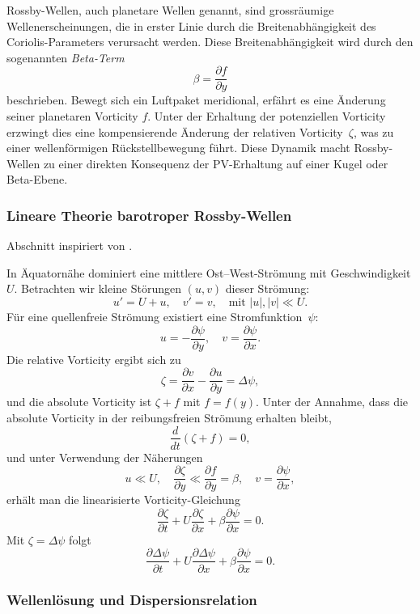 
Rossby-Wellen, auch planetare Wellen genannt, sind grossräumige Wellenerscheinungen, die in erster Linie durch die Breitenabhängigkeit des Coriolis-Parameters verursacht werden. Diese Breitenabhängigkeit wird durch den sogenannten \emph{Beta-Term}
\[
	\beta = \frac{\partial f}{\partial y}
\]
beschrieben. Bewegt sich ein Luftpaket meridional, erfährt es eine Änderung seiner planetaren Vorticity \(f\). Unter der Erhaltung der potenziellen Vorticity erzwingt dies eine kompensierende Änderung der relativen Vorticity~\(\zeta\), was zu einer wellenförmigen Rückstellbewegung führt. Diese Dynamik macht Rossby-Wellen zu einer direkten Konsequenz der PV-Erhaltung auf einer Kugel oder Beta-Ebene.

\subsubsection{Lineare Theorie barotroper Rossby-Wellen}

Abschnitt inspiriert von \cite{rossby:mueller2018}.

In Äquatornähe dominiert eine mittlere Ost–West-Strömung mit Geschwindigkeit \(U\). Betrachten wir kleine Störungen \((u,v)\) dieser Strömung:
\[
	u' = U + u, \quad v' = v, \quad \text{mit } |u|, |v| \ll U.
\]
Für eine quellenfreie Strömung existiert eine Stromfunktion~\(\psi\):
\[
	u = -\frac{\partial \psi}{\partial y}, \quad v = \frac{\partial \psi}{\partial x}.
\]
Die relative Vorticity ergibt sich zu
\[
	\zeta = \frac{\partial v}{\partial x} - \frac{\partial u}{\partial y} = \Delta \psi,
\]
und die absolute Vorticity ist \(\zeta + f\) mit \(f = f(y)\). Unter der Annahme, dass die absolute Vorticity in der reibungsfreien Strömung erhalten bleibt,
\[
	\frac{d}{dt} (\zeta + f) = 0,
\]
und unter Verwendung der Näherungen
\[
	u \ll U, \quad \frac{\partial \zeta}{\partial y} \ll \frac{\partial f}{\partial y} = \beta, \quad v = \frac{\partial \psi}{\partial x},
\]
erhält man die linearisierte Vorticity-Gleichung
\[
	\frac{\partial \zeta}{\partial t} + U \frac{\partial \zeta}{\partial x} + \beta \frac{\partial \psi}{\partial x} = 0.
\]
Mit \(\zeta = \Delta \psi\) folgt
\[
	\frac{\partial \Delta \psi}{\partial t} + U \frac{\partial \Delta \psi}{\partial x} + \beta \frac{\partial \psi}{\partial x} = 0.
\]

\subsubsection{Wellenlösung und Dispersionsrelation}

